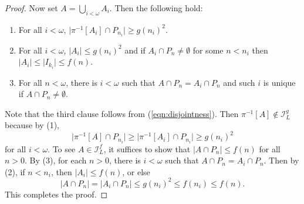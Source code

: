 \documentclass[10pt,a4paper]{amsart}
\newcommand{\I}{\mathscr{I}}
\begin{document}
\begin{proof}
    	Now set $A = \bigcup_{i<\omega}A_i$. Then the following hold:
    	\begin{enumerate}
    		\item For all $i<\omega$, $\lvert\pi^{-1}[A_i]\cap P_{n_i}\rvert \geq g(n_i)^2$.
    		\item For all $i<\omega$, $\lvert A_i\rvert\leq g(n_i)^2$ and if $A_i\cap P_n\neq\emptyset$ for some $n < n_i$ then $\lvert A_i\rvert\leq \lvert I_{k_i}\rvert\leq f(n)$.
    		\item For all $n<\omega$, there is $i<\omega$ such that $A\cap P_n = A_i \cap P_n$ and such $i$ is unique if $A\cap P_n \neq\emptyset$.
    	\end{enumerate}
    	Note that the third clause follows from (\ref{eqn:disjointness}). Then $\pi^{-1}[A]\notin\I_L^g$ because by (1),
    	\[
    	\lvert\pi^{-1}[A]\cap P_{n_i}\rvert \geq \lvert\pi^{-1}[A_i]\cap P_{n_i}\rvert\geq g(n_i)^2
    	\]
    	for all $i<\omega$. To see $A\in\I_L^f$, it suffices to show that $\lvert A\cap P_n\rvert\leq f(n)$ for all $n>0$. By (3), for each $n>0$, there is $i<\omega$ such that $A\cap P_n = A_i\cap P_n$. Then by (2), if $n < n_i$, then $\lvert A_i\rvert\leq f(n)$, or else
    	\[
    	\lvert A\cap P_n\rvert = \lvert A_i \cap P_n\rvert \leq g(n_i)^2 \leq f(n_i) \leq f(n).
    	\]
    	This completes the proof.
    \end{proof}
\end{document}

